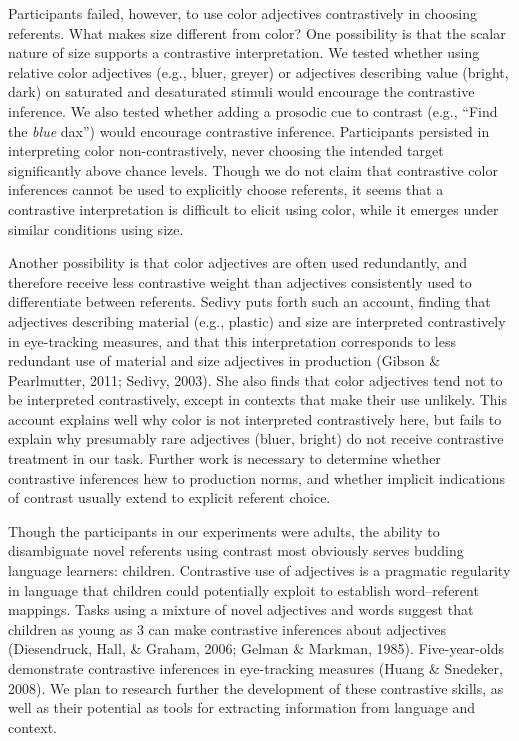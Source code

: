 \documentclass[10pt, letterpaper]{article}
\begin{document}
Participants failed, however, to use color adjectives contrastively in
choosing referents. What makes size different from color? One
possibility is that the scalar nature of size supports a contrastive
interpretation. We tested whether using relative color adjectives (e.g.,
bluer, greyer) or adjectives describing value (bright, dark) on
saturated and desaturated stimuli would encourage the contrastive
inference. We also tested whether adding a prosodic cue to contrast
(e.g., ``Find the \emph{blue} dax'') would encourage contrastive
inference. Participants persisted in interpreting color
non-contrastively, never choosing the intended target significantly
above chance levels. Though we do not claim that contrastive color
inferences cannot be used to explicitly choose referents, it seems that
a contrastive interpretation is difficult to elicit using color, while
it emerges under similar conditions using size.

Another possibility is that color adjectives are often used redundantly,
and therefore receive less contrastive weight than adjectives
consistently used to differentiate between referents. Sedivy puts forth
such an account, finding that adjectives describing material (e.g.,
plastic) and size are interpreted contrastively in eye-tracking
measures, and that this interpretation corresponds to less redundant use
of material and size adjectives in production (Gibson \& Pearlmutter,
2011; Sedivy, 2003). She also finds that color adjectives tend not to be
interpreted contrastively, except in contexts that make their use
unlikely. This account explains well why color is not interpreted
contrastively here, but fails to explain why presumably rare adjectives
(bluer, bright) do not receive contrastive treatment in our task.
Further work is necessary to determine whether contrastive inferences
hew to production norms, and whether implicit indications of contrast
usually extend to explicit referent choice.

Though the participants in our experiments were adults, the ability to
disambiguate novel referents using contrast most obviously serves
budding language learners: children. Contrastive use of adjectives is a
pragmatic regularity in language that children could potentially exploit
to establish word--referent mappings. Tasks using a mixture of novel
adjectives and words suggest that children as young as 3 can make
contrastive inferences about adjectives (Diesendruck, Hall, \& Graham,
2006; Gelman \& Markman, 1985). Five-year-olds demonstrate contrastive
inferences in eye-tracking measures (Huang \& Snedeker, 2008). We plan
to research further the development of these contrastive skills, as well
as their potential as tools for extracting information from language and
context.
\end{document}
